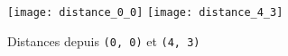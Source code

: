 \begin{figure}[H]
	\begin{center}
		\texttt{[image: distance\_0\_0]}
\hfill
		\texttt{[image: distance\_4\_3]}
	\end{center}
	\caption{Distances depuis \texttt{(0, 0)} et \texttt{(4, 3)}}
\end{figure}


